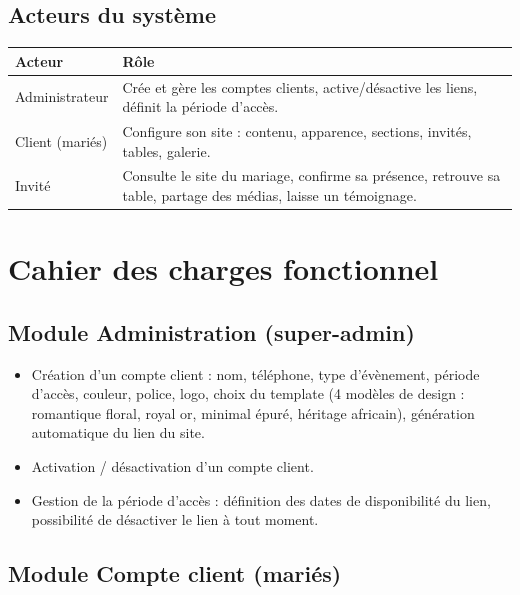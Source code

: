 \documentclass[11pt,a4paper]{article}
\begin{document}
\subsection{Acteurs du système}
\begin{longtable}{L{3.5cm}L{10.5cm}}
\toprule
\textbf{Acteur} & \textbf{Rôle} \\
\midrule
\endhead
Administrateur & Crée et gère les comptes clients, active/désactive les liens, définit
la période d'accès. \\
Client (mariés) & Configure son site : contenu, apparence, sections, invités, tables,
galerie. \\
Invité & Consulte le site du mariage, confirme sa présence, retrouve sa table, partage
des médias, laisse un témoignage. \\
\bottomrule
\end{longtable}

\section{Cahier des charges fonctionnel}

\subsection{Module Administration (super-admin)}
\begin{itemize}[leftmargin=1.2cm]
  \item Création d'un compte client : nom, téléphone, type d'évènement, période
        d'accès, couleur, police, logo, choix du template (4 modèles de design :
        romantique floral, royal or, minimal épuré, héritage africain),
        génération automatique du lien du site.
  \item Activation / désactivation d'un compte client.
  \item Gestion de la période d'accès : définition des dates de disponibilité du lien,
        possibilité de désactiver le lien à tout moment.
\end{itemize}

\subsection{Module Compte client (mariés)}
\end{document}
